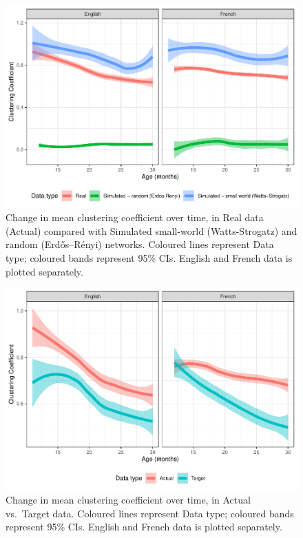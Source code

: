 \documentclass[
  man,floatsintext]{apa6}
\begin{document}
\begin{figure}
\centering
\includegraphics{NetworkGraphs_supplementary-data_files/figure-latex/Figure-clust-coef-age-1.pdf}
\caption{\label{fig:Figure-clust-coef-age}Change in mean clustering coefficient over time, in Real data (Actual) compared with Simulated small-world (Watts-Strogatz) and random (Erdős--Rényi) networks. Coloured lines represent Data type; coloured bands represent 95\% CIs. English and French data is plotted separately.}
\end{figure}

\begin{figure}
\centering
\includegraphics{NetworkGraphs_supplementary-data_files/figure-latex/Figure-clust-coef-DT-age-1.pdf}
\caption{\label{fig:Figure-clust-coef-DT-age}Change in mean clustering coefficient over time, in Actual vs.~Target data. Coloured lines represent Data type; coloured bands represent 95\% CIs. English and French data is plotted separately.}
\end{figure}


\clearpage
\renewcommand{\listfigurename}{Figure captions}
\end{document}
